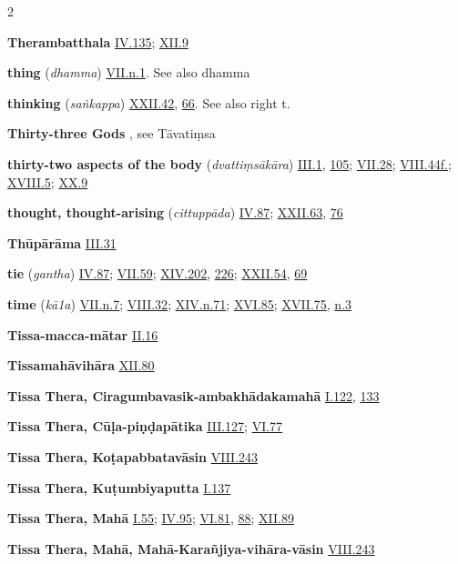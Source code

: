 \begin{multicols}{2}
\begin{vismHanging}
\par\textbf{Therambatthala} \hyperlink{IV.135}{IV.135}{}; \hyperlink{XII.9}{XII.9}{}
\par\textbf{thing} (\emph{dhamma}) \hyperlink{VII.n1}{VII.n.1}{}. See also dhamma
\par\textbf{thinking} (\emph{saṅkappa}) \hyperlink{XXII.42}{XXII.42}{}, \hyperlink{XXII.66}{66}{}. See also right t. 
\par\textbf{Thirty-three Gods} , see Tāvatiṃsa
\par\textbf{thirty-two aspects of the body} (\emph{dvattiṃsākāra}) \hyperlink{III.1}{III.1}{}, \hyperlink{III.105}{105}{}; \hyperlink{VII.28}{VII.28}{}; \hyperlink{VIII.44}{VIII.44f.}{}; \hyperlink{XVIII.5}{XVIII.5}{}; \hyperlink{XX.9}{XX.9}{}
\par\textbf{thought, thought-arising} (\emph{cittuppāda}) \hyperlink{IV.87}{IV.87}{}; \hyperlink{XXII.63}{XXII.63}{}, \hyperlink{XXII.76}{76}{}
\par\textbf{Thūpārāma} \hyperlink{III.31}{III.31}{}
\par\textbf{tie} (\emph{gantha}) \hyperlink{IV.87}{IV.87}{}; \hyperlink{VII.59}{VII.59}{}; \hyperlink{XIV.202}{XIV.202}{}, \hyperlink{XIV.226}{226}{}; \hyperlink{XXII.54}{XXII.54}{}, \hyperlink{XXII.69}{69}{}
\par\textbf{time} (\emph{kā1a}) \hyperlink{VII.n7}{VII.n.7}{}; \hyperlink{VIII.32}{VIII.32}{}; \hyperlink{XIV.n71}{XIV.n.71}{}; \hyperlink{XVI.85}{XVI.85}{}; \hyperlink{XVII.75}{XVII.75}{}, \hyperlink{XVII.n3}{n.3}{}
\par\textbf{Tissa-macca-mātar} \hyperlink{II.16}{II.16}{}
\par\textbf{Tissamahāvihāra} \hyperlink{XII.80}{XII.80}{}
\par\textbf{Tissa Thera, Ciragumbavasik-ambakhādakamahā} \hyperlink{I.122}{I.122}{}, \hyperlink{I.133}{133}{}
\par\textbf{Tissa Thera, Cūḷa-piṇḍapātika} \hyperlink{III.127}{III.127}{}; \hyperlink{VI.77}{VI.77}{}
\par\textbf{Tissa Thera, Koṭapabbatavāsin} \hyperlink{VIII.243}{VIII.243}{}
\par\textbf{Tissa Thera, Kuṭumbiyaputta} \hyperlink{I.137}{I.137}{}
\par\textbf{Tissa Thera, Mahā} \hyperlink{I.55}{I.55}{}; \hyperlink{IV.95}{IV.95}{}; \hyperlink{VI.81}{VI.81}{}, \hyperlink{VI.88}{88}{}; \hyperlink{XII.89}{XII.89}{}
\par\textbf{Tissa Thera, Mahā, Mahā-Karañjiya-vihāra-vāsin} \hyperlink{VIII.243}{VIII.243}{}

\end{vismHanging}
\end{multicols}
